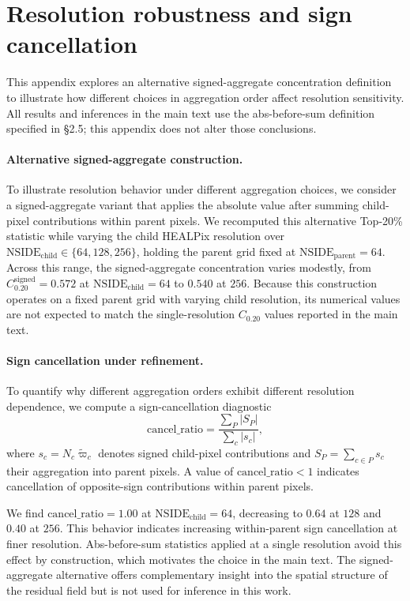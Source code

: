 \appendix
\section{Resolution robustness and sign cancellation}

This appendix explores an alternative signed-aggregate concentration definition
to illustrate how different choices in aggregation order affect resolution
sensitivity. All results and inferences in the main text use the abs-before-sum
definition specified in \S2.5; this appendix does not alter those conclusions.

\paragraph{Alternative signed-aggregate construction.}
To illustrate resolution behavior under different aggregation choices, we
consider a signed-aggregate variant that applies the absolute value after
summing child-pixel contributions within parent pixels. We recomputed this
alternative Top-20\% statistic while varying the child HEALPix resolution over
$\mathrm{NSIDE}_{\mathrm{child}} \in \{64,128,256\}$,
holding the parent grid fixed at
$\mathrm{NSIDE}_{\mathrm{parent}} = 64$.
Across this range, the signed-aggregate concentration varies modestly, from
$C_{0.20}^{\mathrm{signed}} = 0.572$ at
$\mathrm{NSIDE}_{\mathrm{child}} = 64$
to $0.540$ at $256$.
Because this construction operates on a fixed parent grid with varying child
resolution, its numerical values are not expected to match the single-resolution
$C_{0.20}$ values reported in the main text.

\paragraph{Sign cancellation under refinement.}
To quantify why different aggregation orders exhibit different resolution
dependence, we compute a sign-cancellation diagnostic
\[
\mathrm{cancel\_ratio}
= \frac{\sum_P |S_P|}{\sum_c |s_c|},
\]
where $s_c = N_c \tilde{\varpi}_c$ denotes signed child-pixel contributions and
$S_P = \sum_{c \in P} s_c$ their aggregation into parent pixels.
A value of $\mathrm{cancel\_ratio} < 1$ indicates cancellation of opposite-sign
contributions within parent pixels.

We find $\mathrm{cancel\_ratio} = 1.00$ at
$\mathrm{NSIDE}_{\mathrm{child}} = 64$, decreasing to $0.64$ at $128$ and
$0.40$ at $256$.
This behavior indicates increasing within-parent sign cancellation at finer
resolution. Abs-before-sum statistics applied at a single resolution avoid
this effect by construction, which motivates the choice in the main text.
The signed-aggregate alternative offers complementary insight into the
spatial structure of the residual field but is not used for inference in
this work.

